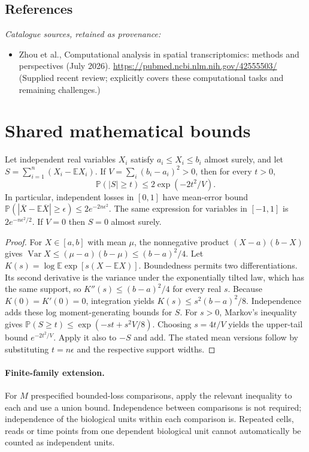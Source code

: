 \documentclass[11pt]{article}
\begin{document}
\subsection{References}
\noindent\emph{Catalogue sources, retained as provenance:}
\begin{itemize}
\item Zhou et al., Computational analysis in spatial transcriptomics: methods and perspectives (July 2026). \url{https://pubmed.ncbi.nlm.nih.gov/42555503/} (Supplied recent review; explicitly covers these computational tasks and remaining challenges.)
\end{itemize}




\section{Shared mathematical bounds}\label{app:bounds}
\begin{lemma}\label{lem:bounded}
Let independent real variables $X_i$ satisfy $a_i\leq X_i\leq b_i$ almost surely,
and let $S=\sum_{i=1}^n(X_i-\mathbb{E} X_i)$. If
$V=\sum_i(b_i-a_i)^2>0$, then for every $t>0$,
\[
 \mathbb{P}(|S|\geq t)\leq 2\exp(-2t^2/V).
\]
In particular, independent losses in $[0,1]$ have mean-error bound
$\mathbb{P}(|\overline X-\mathbb{E}\overline X|\geq\epsilon)
\leq2e^{-2n\epsilon^2}$. The same expression for variables in $[-1,1]$
is $2e^{-n\epsilon^2/2}$. If $V=0$ then $S=0$ almost surely.
\end{lemma}
\begin{proof}
For $X\in[a,b]$ with mean $\mu$, the nonnegative product
$(X-a)(b-X)$ gives
$\operatorname{Var} X\leq(\mu-a)(b-\mu)\leq(b-a)^2/4$.
Let $K(s)=\log\mathbb{E}\exp[s(X-\mathbb{E} X)]$.
Boundedness permits two differentiations. Its second derivative is the variance
under the exponentially tilted law, which has the same support, so
$K''(s)\leq(b-a)^2/4$ for every real $s$.
Because $K(0)=K'(0)=0$, integration yields
$K(s)\leq s^2(b-a)^2/8$.
Independence adds these log moment-generating bounds for $S$.
For $s>0$, Markov's inequality gives
$\mathbb{P}(S\geq t)\leq\exp(-st+s^2V/8)$.
Choosing $s=4t/V$ yields the upper-tail bound $e^{-2t^2/V}$.
Apply it also to $-S$ and add. The stated mean versions follow by substituting
$t=n\epsilon$ and the respective support widths.
\end{proof}

\paragraph{Finite-family extension.}
For $M$ prespecified bounded-loss comparisons, apply the relevant inequality to
each and use a union bound. Independence between comparisons is not required;
independence of the biological units within each comparison is. Repeated cells,
reads or time points from one dependent biological unit cannot automatically be
counted as independent units.
\end{document}
